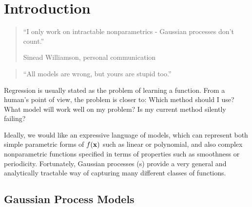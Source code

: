 
\inbpdocument

\chapter{Introduction}
\label{ch:intro}


\begin{quotation}
``I only work on intractable nonparametrics - Gaussian processes don't count.''

\hspace*{\fill} Sinead Williamson, personal communication
\end{quotation}


\begin{quotation}
``All models are wrong, but yours are stupid too.''

\hspace*{\fill} \citet{mlhipster} %
\end{quotation}

\nomenclature[g-pi]{$\pi$}{ $\simeq 3.14\ldots$}


Regression is usually stated as the problem of learning a function.
%
From a human's point of view, the problem is closer to: Which method should I use?  What model will work well on my problem?  Is my current method silently failing?


Ideally, we would like an expressive language of models, which can represent both simple parametric forms of $f({\bf{x}})$ such as linear or polynomial, and also complex nonparametric functions specified in terms of properties such as smoothness or periodicity.
Fortunately, Gaussian processes (\gp{}s) provide a very general and analytically tractable way of capturing many different classes of functions.






\section{Gaussian Process Models}

